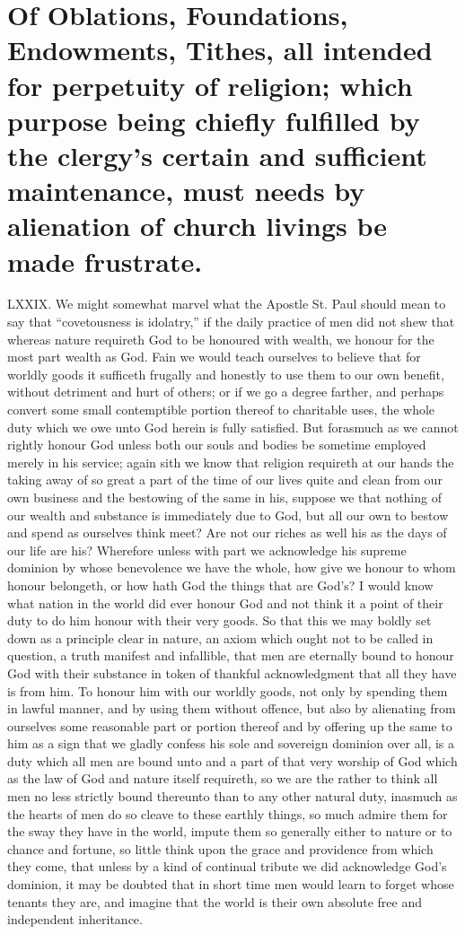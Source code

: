 \section*{Of Oblations, Foundations, Endowments, Tithes, all intended for perpetuity of religion; which purpose being chiefly fulfilled by the clergy’s certain and sufficient maintenance, must needs by alienation of church livings be made frustrate.}
LXXIX. We might somewhat marvel what the Apostle St. Paul should mean to say that “covetousness is idolatry,” if the daily practice of men did not shew that whereas nature requireth God to be honoured with wealth, we honour for the most part wealth as God. Fain we would teach ourselves to believe that for worldly goods it sufficeth frugally and honestly to use them to our own benefit, without detriment and hurt of others; or if we go a degree farther, and perhaps convert some small contemptible portion thereof to charitable uses, the whole duty which we owe unto God herein is fully satisfied. But forasmuch as we cannot rightly honour God unless both our souls and bodies be sometime employed merely in his service; again sith we know that religion requireth at our hands the taking away of so great a part of the time of our lives quite and clean from our own business and the bestowing of the same in his, suppose we that nothing of our wealth and substance is immediately due to God, but all our own to bestow and spend as ourselves think  meet? Are not our riches as well his as the days of our life are his?
 Wherefore unless with part we acknowledge his supreme dominion by whose benevolence we have the whole, how give we honour to whom honour belongeth, or how hath God the things that are God’s? I would know what nation in the world did ever honour God and not think it a point of their duty to do him honour with their very goods. So that this we may boldly set down as a principle clear in nature, an axiom which ought not to be called in question, a truth manifest and infallible, that men are eternally bound to honour God with their substance in token of thankful acknowledgment that all they have is from him. To honour him with our worldly goods, not only by spending them in lawful manner, and by using them without offence, but also by alienating from ourselves some reasonable part or portion thereof and by offering up the same to him as a sign that we gladly confess his sole and sovereign dominion over all, is a duty which all men are bound unto and a part of that very worship of God which as the law of God and nature itself requireth, so we are the rather to think all men no less strictly bound thereunto than to any other natural duty, inasmuch as the hearts of men do so cleave to these earthly things, so much admire them for the sway they have in the world, impute them so generally either to nature or to chance and fortune, so little think upon the grace and providence from which they come, that unless by a kind of continual tribute we did acknowledge God’s dominion, it may be doubted that in short time men would learn to forget whose tenants they are, and imagine that the world is their own absolute free and independent inheritance.


